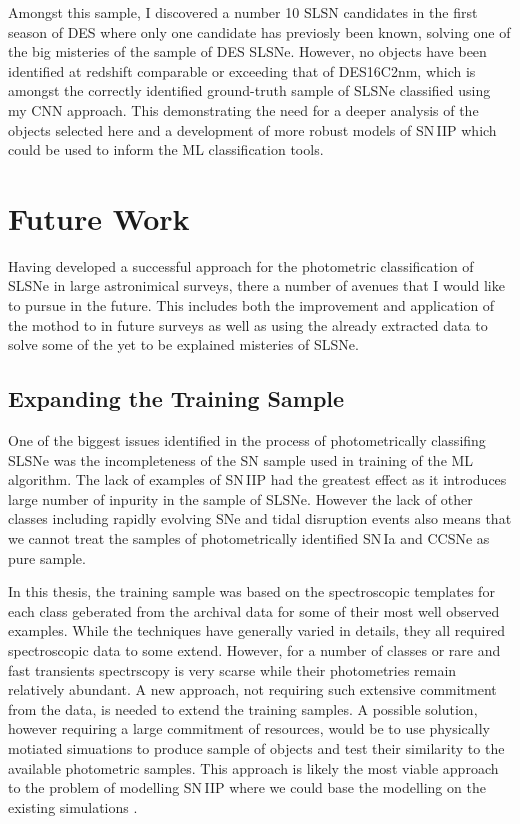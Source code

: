Amongst this sample, I discovered a number 10 SLSN candidates in the first season of DES where only one candidate has previosly been known, solving one of the big misteries of the sample of DES SLSNe. However, no objects have been identified at redshift comparable or exceeding that of DES16C2nm, which is amongst the correctly identified ground-truth sample of SLSNe classified using my CNN approach. This demonstrating the need for a deeper analysis of the objects selected here and a development of more robust models of SN\,IIP which could be used to inform the ML classification tools.

\section{Future Work}
Having developed a successful approach for the photometric classification of SLSNe in large astronimical surveys, there a number of avenues that I would like to pursue in the future. This includes both the improvement and application of the mothod to in future surveys as well as using the already extracted data to solve some of the yet to be explained misteries of SLSNe.

\subsection{Expanding the Training Sample}
One of the biggest issues identified in the process of photometrically classifing SLSNe was the incompleteness of the SN sample used in training of the ML algorithm. The lack of examples of SN\,IIP had the greatest effect as it introduces large number of inpurity in the sample of SLSNe. However the lack of other classes including rapidly evolving SNe and tidal disruption events also means that we cannot treat the samples of photometrically identified SN\,Ia and CCSNe as pure sample.

In this thesis, the training sample was based on the spectroscopic templates for each class geberated from the archival data for some of their most well observed examples. While the techniques have generally varied in details, they all required spectroscopic data to some extend. However, for a number of classes or rare and fast transients spectrscopy is very scarse while their photometries remain relatively abundant. A new approach, not requiring such extensive commitment from the data, is needed to extend the training samples. A possible solution, however requiring a large commitment of resources, would be to use physically motiated simuations to produce sample of objects and test their similarity to the available photometric samples. This approach is likely the most viable approach to the problem of modelling SN\,IIP where we could base the modelling on the existing simulations \citep{Dessart2013,Dessart2016}.

